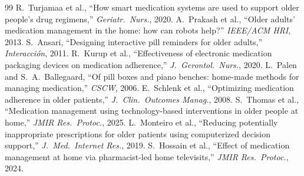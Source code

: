 \documentclass[10pt,twocolumn]{article}
\begin{document}
\begin{thebibliography}{99}
 R.\ Turjamaa et al., ``How smart medication systems are used to support older people's drug regimens,'' \emph{Geriatr.\ Nurs.}, 2020.
 A.\ Prakash et al., ``Older adults' medication management in the home: how can robots help?'' \emph{IEEE/ACM HRI}, 2013.
 S.\ Ansari, ``Designing interactive pill reminders for older adults,'' \emph{Interacci\'on}, 2011.
 R.\ Kurup et al., ``Effectiveness of electronic medication packaging devices on medication adherence,'' \emph{J.\ Gerontol.\ Nurs.}, 2020.
 L.\ Palen and S.\ A.\ Ballegaard, ``Of pill boxes and piano benches: home-made methods for managing medication,'' \emph{CSCW}, 2006.
 E.\ Schlenk et al., ``Optimizing medication adherence in older patients,'' \emph{J.\ Clin.\ Outcomes Manag.}, 2008.
 S.\ Thomas et al., ``Medication management using technology-based interventions in older people at home,'' \emph{JMIR Res.\ Protoc.}, 2025.
 L.\ Monteiro et al., ``Reducing potentially inappropriate prescriptions for older patients using computerized decision support,'' \emph{J.\ Med.\ Internet Res.}, 2019.
 S.\ Hossain et al., ``Effect of medication management at home via pharmacist-led home televisits,'' \emph{JMIR Res.\ Protoc.}, 2024.
\end{thebibliography}
\end{document}
